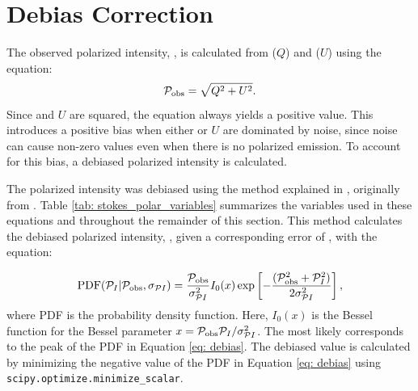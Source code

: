 
\section{Debias Correction}
\label{sec: debias_correction}

The observed polarized intensity, \POLIobsNS, is calculated from \SQ ($Q$) and \SU ($U$) using the equation: 
\begin{equation}
    \mathcal{P}_\text{obs} = \sqrt{Q^2 + U^2}.
    \label{eq: POLI}
\end{equation}
\noindent Since \SQ and $U$ are squared, the equation always yields a positive value. This introduces a positive bias when either \SQ or $U$ are dominated by noise, since noise can cause non-zero values even when there is no polarized emission. To account for this bias, a debiased polarized intensity is calculated. 



The polarized intensity was debiased using the method explained in \cite{sadavoy_dust_2019}, originally from \cite{HullDebias}. Table \ref{tab: stokes_polar_variables} summarizes the variables used in these equations and throughout the remainder of this section. This method calculates the debiased polarized intensity, \POLIns, given a corresponding error of \POLIerrNS, with the equation:

\begin{equation}
    \text{PDF}(\mathcal{P}_I|\mathcal{P}_\text{obs}, \sigma_{\mathcal{P}I})=\frac{\mathcal{P}_\text{obs}}{\sigma_{\mathcal{P}I}^2} I_0(x)\exp\left[-\frac{(\mathcal{P}_\text{obs}^2 + \mathcal{P}_I^2)}{2\sigma_{\mathcal{P}I}^2}{}\right],
    \label{eq: debias}
\end{equation}
\noindent where PDF is the probability density function. Here, $I_0(x)$ is the Bessel function for the Bessel parameter $x = \mathcal{P}_\text{obs} \mathcal{P}_I/\sigma_{\mathcal{P}I}^2$. The most likely \POLI corresponds to the peak of the PDF in Equation \ref{eq: debias}. The debiased value is calculated by minimizing the negative value of the PDF in Equation \ref{eq: debias} using \texttt{scipy.optimize.minimize\_scalar}. 



